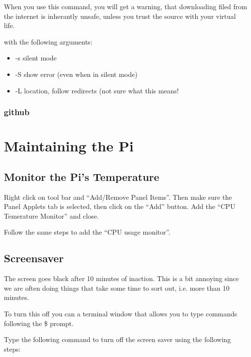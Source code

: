 \documentclass{article}\usepackage[]{graphicx}\usepackage[]{color}
\begin{document}
When you use this command, you will get a warning, that downloading filed from the internet is inherantly unsafe, unless you trust the source with your virtual life. 

with the following arguments: 

\begin{itemize}
  \item -s silent mode
  \item -S show error (even when in silent mode)
  \item -L location, follow redirects (not sure what this means!
\end{itemize}



\subsubsection{github}


\section{Maintaining the Pi}

\subsection{Monitor the Pi's Temperature}

Right click on tool bar and ``Add/Remove Panel Items''. Then make sure the Panel Applets tab is selected, then click on the ``Add'' button. 
Add the ``CPU Temerature Monitor'' and close.

Follow the same steps to add the ``CPU usage monitor''.

\subsection{Screensaver}

The screen goes black after 10 minutes of inaction. This is a bit annoying since we are often doing things that take some time to sort out, i.e. more than 10 minutes. 

To turn this off you can a terminal window that allows you to type commands following the \$ prompt. 

Type the following command to turn off the screen saver using the following steps: 
\end{document}
